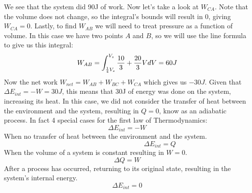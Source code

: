 \documentclass[11pt]{article}
\begin{document}
    \vspace{2em}
\noindent We see that the system did 90J of work. Now let's take a look at $W_{CA}$.
    Note that the volume does not change, so the integral's bounds will result in 0,
    giving $W_{CA} = 0$. Lastly, to find $W_{AB}$ we will need to treat pressure as a
    function of volume. In this case we have two points $A$ and $B$,
    so we will use the line formula to give us this integral:
    \begin{equation}
        W_{AB} = \int_{\frac{1}{4}V_s}^{V_s} \frac{10}{3} + \frac{20}{3}V dV
        = 60 J \notag
    \end{equation}
    Now the net work $W_{net} = W_{AB} + W_{BC} + W_{CA}$ which gives us $-30J.$
    Given that $\Delta E_{int} = - W = 30J$,
    this means that 30J of energy was done on the system, increasing its heat.
    In this case, we did not consider the transfer of heat between the environment and the system,
    resulting in $Q = 0$, know as an adiabatic process.
    In fact 4 special cases for the first law of Thermodynamics:
    \begin{equation}
        \Delta E_{int} = -W \tag{adiabatic process}
    \end{equation}
    When no transfer of heat between the environment and the system.
    \begin{equation}
       \hspace{4cm} \Delta E_{int} = Q\tag{Constant-volume process}
    \end{equation}
    When the volume of a system is constant resulting in $W = 0$.
    \begin{equation}
        \Delta Q = W\tag{Cyclical process}
    \end{equation}
    After a process has occurred, returning to its original state,
    resulting in the system's internal energy.
    \begin{equation}
        \Delta E_{int} = 0 \tag{Free expansions}
    \end{equation}
\end{document}
